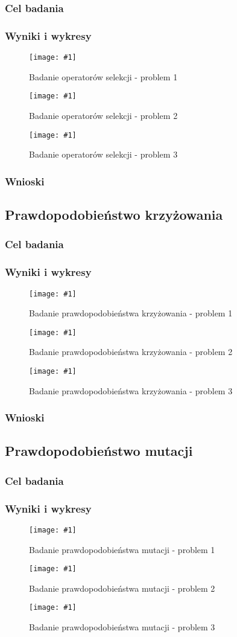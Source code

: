 \documentclass[12pt,a4paper]{article}
\newcommand{\image}[2] {
    \begin{figure}[H]
        \begin{center}
            \texttt{[image: \#1]}
        \end{center}
        \caption{#2}
        \label{#1}
    \end{figure}
}
\begin{document}
\subsubsection{Cel badania}
\subsubsection{Wyniki i wykresy}
\image{images/Badanie operatorów_1}{Badanie operatorów selekcji - problem 1}
\image{images/Badanie operatorów_2}{Badanie operatorów selekcji - problem 2}
\image{images/Badanie operatorów_3}{Badanie operatorów selekcji - problem 3}
\subsubsection{Wnioski}
\subsection{Prawdopodobieństwo krzyżowania}
\subsubsection{Cel badania}
\subsubsection{Wyniki i wykresy}
\image{images/Badanie p. krzyżowania_1}{Badanie prawdopodobieństwa krzyżowania - problem 1}
\image{images/Badanie p. krzyżowania_2}{Badanie prawdopodobieństwa krzyżowania - problem 2}
\image{images/Badanie p. krzyżowania_3}{Badanie prawdopodobieństwa krzyżowania - problem 3}
\subsubsection{Wnioski}
\subsection{Prawdopodobieństwo mutacji}
\subsubsection{Cel badania}
\subsubsection{Wyniki i wykresy}
\image{images/Badanie p. mutacji_1}{Badanie prawdopodobieństwa mutacji - problem 1}
\image{images/Badanie p. mutacji_2}{Badanie prawdopodobieństwa mutacji - problem 2}
\image{images/Badanie p. mutacji_3}{Badanie prawdopodobieństwa mutacji - problem 3}
\end{document}
